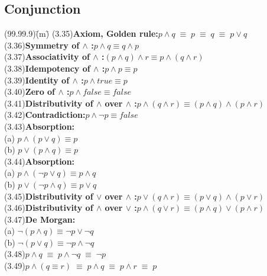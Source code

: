 \documentclass[fleqn, leqno]{article}
\newcommand{\lgap}{2pt}                             %
\newcommand{\equivs}{\ensuremath{\;\equiv\;}}       %
\begin{document}
\subsection*{Conjunction}
\begin{tabbing}
(99.99.9)\;\=(m)\;\=\kill
(3.35)\>\textbf{Axiom, Golden rule:}\quad $p\land q\equivs p\equivs q\equivs p\lor q$\\[\lgap]
(3.36)\>\textbf{Symmetry of $\land$ :}\quad $p\land q \equiv q\land p$\\[\lgap]
(3.37)\>\textbf{Associativity of $\land$ :}\quad $(p\land q) \land r\equiv p\land (q\land r)$\\[\lgap]
(3.38)\>\textbf{Idempotency of $\land$ :}\quad  $p\land p \equiv p$\\[\lgap]
(3.39)\>\textbf{Identity of $\land$ :}\quad $p\land true\equiv p$\\[\lgap]
(3.40)\>\textbf{Zero of $\land$ :}\quad $p\land false\equiv false$\\[\lgap]
(3.41)\>\textbf{Distributivity of $\land$ over $\land$ :}\quad $p\land (q\land r)\equiv (p\land q)\land (p\land r)$\\[\lgap]
(3.42)\>\textbf{Contradiction:}\quad $p \land \neg p \equiv false$\\[\lgap]
(3.43)\>\textbf{Absorption:}\\
      \> (a)\> $p \land (p \lor q) \equiv p$\\[\lgap]
      \> (b)\> $p \lor (p \land q) \equiv p$\\[\lgap]
(3.44)\>\textbf{Absorption:}\\
      \> (a)\> $p \land (\neg p \lor q) \equiv p \land q$\\[\lgap]
      \> (b)\> $p \lor (\neg p \land q) \equiv p \lor q$\\[\lgap]
(3.45)\>\textbf{Distributivity of $\lor$ over $\land$ :}\quad $p\lor (q\land r)\equiv (p\lor q)\land (p\lor r)$\\[\lgap]
(3.46)\>\textbf{Distributivity of $\land$ over $\lor$ :}\quad $p\land (q\lor r)\equiv (p\land q)\lor (p\land r)$\\[\lgap]
(3.47)\>\textbf{De Morgan:}\\
      \> (a)\> $\neg (p \land q) \equiv \neg p \lor \neg q$\\[\lgap]
      \> (b)\> $\neg (p \lor q) \equiv \neg p \land \neg q$\\[\lgap]
(3.48)\>$p\land q\equivs p\land \neg q\equivs \neg p$\\[\lgap]
(3.49)\>$p\land (q\equiv r)\equivs p\land q\equivs p\land r \equivs p$\\[\lgap]

\end{tabbing}
\end{document}
